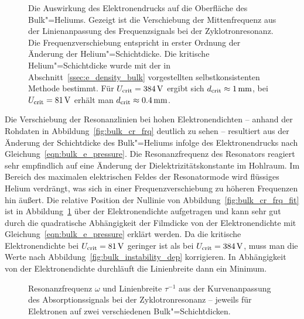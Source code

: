 \begin{figure}[h!tbp]
	\hfill%
	\begin{minipage}[b]{\textwidth-\smallwidth-\tabcolsep}
		\caption[Frequenzverschiebung durch den Elektronendruck]{Die Auswirkung des Elektronendrucks auf die Oberfläche des Bulk"=Heliums. Gezeigt ist die Verschiebung der Mittenfrequenz aus der Linienanpassung des Frequenzsignals bei der Zyklotronresonanz. Die Frequenzverschiebung entspricht in erster Ordnung der Änderung der Helium"=Schichtdicke. Die kritische Helium"=Schichtdicke wurde mit der in Abschnitt~\ref{ssec:e_density_bulk} vorgestellten selbstkonsistenten Methode bestimmt. Für $U_\text{crit}=\unit[384]{V}$ ergibt sich $d_\text{crit}\approx\unit[1]{mm}$, bei $U_\text{crit}=\unit[81]{V}$ erhält man $d_\text{crit}\approx\unit[0.4]{mm}$.}
		\label{fig:bulk_cr_shift}
	\end{minipage}
\end{figure}

Die Verschiebung der Resonanzlinien bei hohen Elektronendichten -- anhand der Rohdaten in Abbildung~\ref{fig:bulk_cr_frq} deutlich zu sehen -- resultiert aus der Änderung der Schichtdicke des Bulk"=Heliums infolge des Elektronendrucks nach Gleichung~\ref{eqn:bulk_e_pressure}. Die Resonanzfrequenz des Resonators reagiert sehr empfindlich auf eine Änderung der Dielektrizitätskonstante im Hohlraum. Im Bereich des maximalen elektrischen Feldes der Resonatormode wird flüssiges Helium verdrängt, was sich in einer Frequenzverschiebung zu höheren Frequenzen hin äußert. Die relative Position der Nullinie von Abbildung~\ref{fig:bulk_cr_frq_fit} ist in Abbildung~\ref{fig:bulk_cr_shift} über der Elektronendichte aufgetragen und kann sehr gut durch die quadratische Abhängigkeit der Filmdicke von der Elektronendichte mit Gleichung~\eqref{eqn:bulk_e_pressure} erklärt werden. Da die kritische Elektronendichte bei $U_\text{crit}=\unit[81]{V}$ geringer ist als bei $U_\text{crit}=\unit[384]{V}$, muss man die Werte nach Abbildung~\ref{fig:bulk_instability_dep} korrigieren. In Abhängigkeit von der Elektronendichte durchläuft die Linienbreite dann ein Minimum. 

\begin{figure}[h!tbp]
	\begin{center}
	\end{center}
	\caption[Frequenz und Linienbreite der Zyklotronresonanz]{Resonanzfrequenz $\omega$ und Linienbreite $\tau^{-1}$ aus der Kurvenanpassung des Absorptionssignals bei der Zyklotronresonanz -- jeweils für Elektronen auf zwei verschiedenen Bulk"=Schichtdicken.}
	\label{fig:bulk_cr_wwt}
\end{figure}

